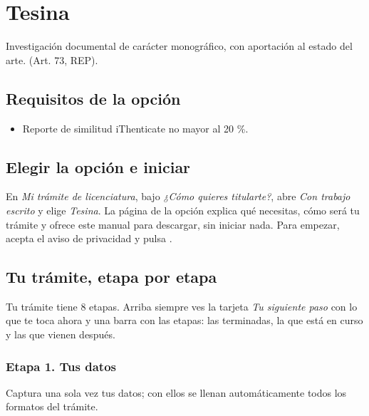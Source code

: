 \section{Tesina}
Investigación documental de carácter monográfico, con aportación al estado del arte. (Art. 73, REP).

\subsection{Requisitos de la opción}
\begin{itemize}
  \item Reporte de similitud iThenticate no mayor al 20 \%.
\end{itemize}
\subsection{Elegir la opción e iniciar}
En \emph{Mi trámite de licenciatura}, bajo \emph{¿Cómo quieres titularte?}, abre \emph{Con trabajo escrito} y elige \emph{Tesina}. La página de la opción explica qué necesitas, cómo será tu trámite y ofrece este manual para descargar, sin iniciar nada. Para empezar, acepta el aviso de privacidad y pulsa .
\subsection{Tu trámite, etapa por etapa}
Tu trámite tiene 8 etapas. Arriba siempre ves la tarjeta \emph{Tu siguiente paso} con lo que te toca ahora y una barra con las etapas: las terminadas, la que está en curso y las que vienen después.
\subsubsection*{Etapa 1. Tus datos}
Captura una sola vez tus datos; con ellos se llenan automáticamente todos los formatos del trámite.

